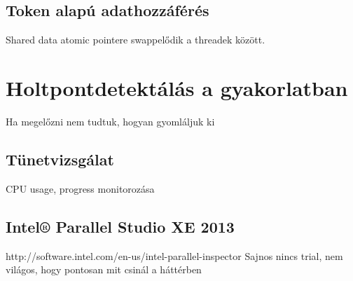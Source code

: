     \subsection{Token alapú adathozzáférés} Shared data atomic pointere swappelődik a threadek között.

\section{Holtpontdetektálás a gyakorlatban} Ha megelőzni nem tudtuk, hogyan gyomláljuk ki
    \subsection{Tünetvizsgálat} CPU usage, progress monitorozása
    \subsection{Intel® Parallel Studio XE 2013} http://software.intel.com/en-us/intel-parallel-inspector Sajnos nincs trial, nem világos, hogy pontosan mit csinál a háttérben
